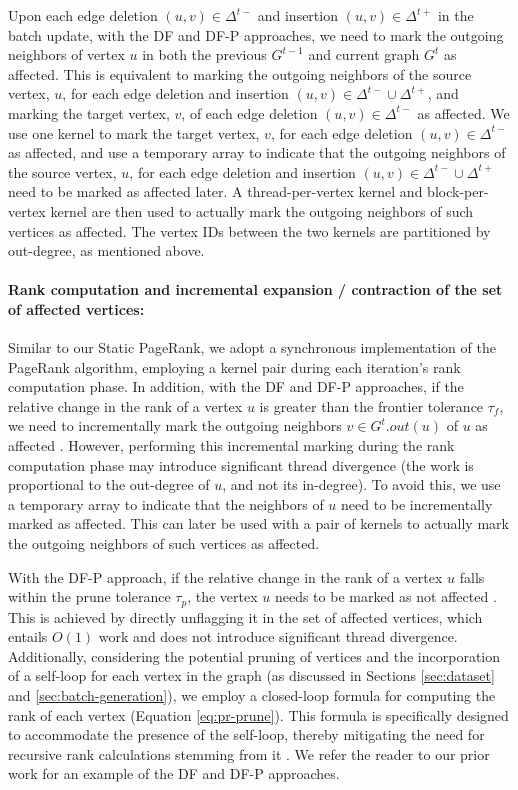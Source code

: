 Upon each edge deletion $(u, v) \in \Delta^{t-}$ and insertion $(u, v) \in \Delta^{t+}$ in the batch update, with the DF and DF-P approaches, we need to mark the outgoing neighbors of vertex $u$ in both the previous $G^{t-1}$ and current graph $G^t$ as affected. This is equivalent to marking the outgoing neighbors of the source vertex, $u$, for each edge deletion and insertion $(u, v) \in \Delta^{t-} \cup \Delta^{t+}$, and marking the target vertex, $v$, of each edge deletion $(u, v) \in \Delta^{t-}$ as affected. We use one kernel to mark the target vertex, $v$, for each edge deletion $(u, v) \in \Delta^{t-}$ as affected, and use a temporary array to indicate that the outgoing neighbors of the source vertex, $u$, for each edge deletion and insertion $(u, v) \in \Delta^{t-} \cup \Delta^{t+}$ need to be marked as affected later. A thread-per-vertex kernel and block-per-vertex kernel are then used to actually mark the outgoing neighbors of such vertices as affected. The vertex IDs between the two kernels are partitioned by out-degree, as mentioned above.

\paragraph{Rank computation and incremental expansion / contraction of the set of affected vertices:}

Similar to our Static PageRank, we adopt a synchronous implementation of the PageRank algorithm, employing a kernel pair during each iteration's rank computation phase. In addition, with the DF and DF-P approaches, if the relative change in the rank of a vertex $u$ is greater than the frontier tolerance $\tau_f$, we need to incrementally mark the outgoing neighbors $v \in G^t.out(u)$ of $u$ as affected \cite{sahu2024df}. However, performing this incremental marking during the rank computation phase may introduce significant thread divergence (the work is proportional to the out-degree of $u$, and not its in-degree). To avoid this, we use a temporary array to indicate that the neighbors of $u$ need to be incrementally marked as affected. This can later be used with a pair of kernels to actually mark the outgoing neighbors of such vertices as affected.

With the DF-P approach, if the relative change in the rank of a vertex $u$ falls within the prune tolerance $\tau_p$, the vertex $u$ needs to be marked as not affected \cite{sahu2024df}. This is achieved by directly unflagging it in the set of affected vertices, which entails $O(1)$ work and does not introduce significant thread divergence. Additionally, considering the potential pruning of vertices and the incorporation of a self-loop for each vertex in the graph (as discussed in Sections \ref{sec:dataset} and \ref{sec:batch-generation}), we employ a closed-loop formula for computing the rank of each vertex (Equation \ref{eq:pr-prune}). This formula is specifically designed to accommodate the presence of the self-loop, thereby mitigating the need for recursive rank calculations stemming from it \cite{sahu2024df}. We refer the reader to our prior work \cite{sahu2024df} for an example of the DF and DF-P approaches.

